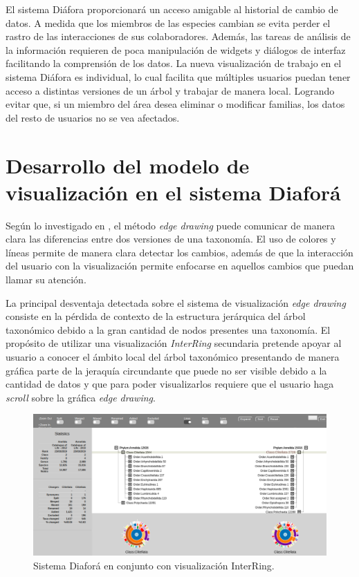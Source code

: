 \documentclass[journal]{IEEEtran}
\begin{document}
El sistema Diáfora proporcionará un acceso amigable al historial de cambio de datos. A medida que los miembros de las especies cambian se evita perder el rastro de las interacciones de sus colaboradores. Además, las tareas de análisis de la información requieren de poca manipulación de widgets y diálogos de interfaz facilitando la comprensión de los datos. 
La nueva visualización de trabajo en el sistema Diáfora es individual, lo cual facilita que múltiples usuarios puedan tener acceso a distintas versiones de un árbol y trabajar de manera local. Logrando evitar que, si un miembro del área desea eliminar o modificar familias, los datos del resto de usuarios no se vea afectados.

\section{Desarrollo del modelo de visualización en el sistema Diaforá}
Según lo investigado en \cite{sancho_diafora}, el método \emph{edge drawing} puede comunicar de manera clara las
diferencias entre dos versiones de una taxonomía. El uso de colores y líneas permite de manera clara detectar los
cambios, además de que la interacción del usuario con la visualización permite enfocarse en aquellos cambios que 
puedan llamar su atención.

La principal desventaja detectada sobre el sistema de visualización \emph{edge drawing} consiste en la pérdida de contexto
de la estructura jerárquica del árbol taxonómico debido a la gran cantidad de nodos presentes una taxonomía.
El propósito de utilizar una visualización \emph{InterRing}\cite{yang_ward_rundensteiner} secundaria pretende apoyar al usuario a conocer
el ámbito local del árbol taxonómico presentando de manera gráfica parte de la jeraquía circundante que puede no ser visible debido a la cantidad de datos
y que para poder visualizarlos requiere que el usuario haga \emph{scroll} sobre la gráfica \emph{edge drawing}.

\begin{figure}[]
  \centering
  \includegraphics[scale=0.20]{extend_diafora.png}
  \caption{Sistema Diaforá en conjunto con visualización InterRing.}
  \label{}
\end{figure}
\end{document}
